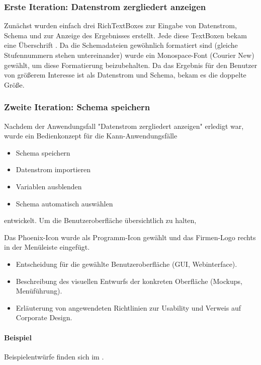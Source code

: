 \subsubsection{Erste Iteration: Datenstrom zergliedert anzeigen}
\label{sec:BenutzeroberflaecheZergliedern}


Zunächst wurden einfach drei RichTextBoxes zur Eingabe von Datenstrom, Schema und zur Anzeige des Ergebnisses erstellt. Jede diese TextBoxen bekam eine Überschrift . Da die Schemadateien gewöhnlich formatiert sind (gleiche Stufennummern stehen untereinander) wurde ein Monospace-Font (Courier New) gewählt, um diese Formatierung beizubehalten. Da das Ergebnis für den Benutzer von größerem Interesse ist als Datenstrom und Schema, bekam es die doppelte Größe.

\subsubsection{Zweite Iteration: Schema speichern}
\label{BenutzeroberflaecheSpeichern}
Nachdem der Anwendungsfall "Datenstrom zergliedert anzeigen" erledigt war, wurde ein Bedienkonzept für die Kann-Anwendungsfälle
\begin{itemize}
\item Schema speichern
\item Datenstrom importieren
\item Variablen ausblenden
\item Schema automatisch auswählen
\end{itemize}
entwickelt. Um die Benutzeroberfläche übersichtlich zu halten, 

Das Phoenix-Icon wurde als Programm-Icon gewählt und das Firmen-Logo rechts in der Menüleiste eingefügt.

\begin{itemize}
	\item Entscheidung für die gewählte Benutzeroberfläche (\zB GUI, Webinterface).
	\item Beschreibung des visuellen Entwurfs der konkreten Oberfläche (\zB Mockups, Menüführung).
	\item \Ggfs Erläuterung von angewendeten Richtlinien zur Usability und Verweis auf Corporate Design.
\end{itemize}



\paragraph{Beispiel}
Beispielentwürfe finden sich im .


